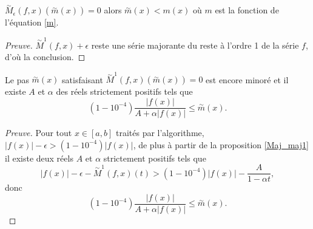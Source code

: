 \documentclass[a4paper,10pt]{article}
\begin{document}
	\begin{proposition}
		$\overset{\sim}{M}_{\epsilon}(f,x)(\overset{\sim}{m}(x))=0$ alors $\overset{\sim}{m}(x)<m(x)$ où $m$ est la fonction de l'équation \eqref{m}.
		\label{minor_m}
	\end{proposition}
	\begin{proof}[Preuve]
		$\overset{\sim}{M}^{1}(f,x)+\epsilon$ reste une série majorante du reste à l'ordre 1 de la série $f$, d'où la conclusion.
	\end{proof}
	\begin{proposition}
		Le pas $\overset{\sim}{m}(x)$ satisfaisant $\overset{\sim}{M}^1(f,x)(\overset{\sim}{m}(x))=0$ est encore minoré et il existe $A$ et $\alpha$ des réels strictement positifs tels que  
		\[(1-10^{-4})\frac{|f(x)|}{A+\alpha|f(x)|}\leq \overset{\sim}{m}(x).\]
		\label{minor1}
	\end{proposition}
	\begin{proof}[Preuve]
		Pour tout $x \in [a,b]$ traités par l'algorithme, $|f(x)|-\epsilon> (1-10^{-4})|f(x)|$, de plus à partir de la proposition \ref{Maj_maj1} il existe deux réels $A$ et $\alpha$ strictement positifs tels que 
		\[|f(x)|-\epsilon-\overset{\sim}{M}^{1}(f,x)(t)>(1-10^{-4})|f(x)|-\frac{A}{1-\alpha t},\]
		donc 
		\[(1-10^{-4})\frac{|f(x)|}{A+\alpha|f(x)|}\leq \overset{\sim}{m}(x).\]
	\end{proof}
	
\end{document}

